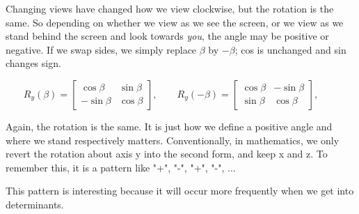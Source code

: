 \documentclass[10pt]{article}
\newcommand{\cB}{\cos\beta}
\newcommand{\sB}{\sin\beta}
\begin{document}
\begin{center}
\end{center}


Changing views have changed how we view clockwise, but the rotation is the same. So depending on whether we view as we see the screen, or we view as we stand behind the screen and look towards \textit{you}, the angle may be positive or negative. If we swap sides, we simply replace $\beta$ by
$-\beta$; cos is unchanged and sin changes sign.

\[
R_y(\beta)=
 \begin{bmatrix}\cB&\sB\\-\sB&\cB\end{bmatrix},\qquad
R_y(-\beta)=
\begin{bmatrix}\cB&-\sB\\\sB&\cB\end{bmatrix},\qquad
\]

Again, the rotation is the same. It is just how we define a positive angle and where we stand respectively matters. Conventionally, in mathematics, we only revert the rotation about axis y into the second form, and keep x and z. To remember this, it is a pattern like "+", "-", "+", "-", ...

This pattern is interesting because it will occur more frequently when we get into determinants.
\end{document}
